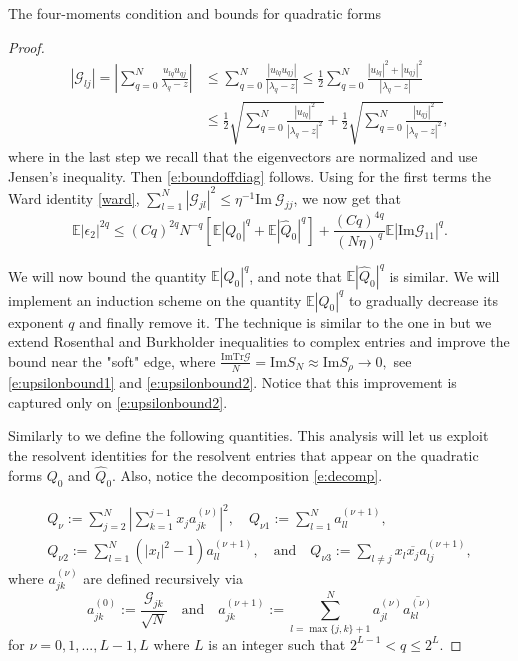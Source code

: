 \documentclass[11pt, a4paper, oneside]{book}
\numberwithin{equation}{chapter}
\newcommand{\E}{\mathbb E}
\newcommand{\Tr}{\mathrm{Tr}}
\begin{document}
\begin{section}{The four-moments condition and bounds for quadratic forms}
\begin{proof}
%
\begin{align*}
|\mathcal{G}_{lj} |= \left|\sum_{q=0}^N \frac{u_{lq}u_{qj}}{\lambda_q - z}\right| &\leq \sum_{q=0}^N \frac{|u_{lq}u_{qj}|}{|\lambda_q - z|}
\leq \frac{1}{2}\sum_{q=0}^N \frac{|u_{lq}|^2 + |u_{qj}|^2}{|\lambda_q - z|} \\ 
&\leq \frac{1}{2}\sqrt{\sum_{q=0}^N \frac{|u_{lq}|^2} {|\lambda_q - z|^2}} + \frac{1}{2}\sqrt{\sum_{q=0}^N \frac{|u_{qj}|^2} {|\lambda_q - z|^2}},
\end{align*}
%
where in the last step we recall that the eigenvectors are normalized and use Jensen's inequality. Then \eqref{e:boundoffdiag} follows. Using for the first terms the Ward identity \eqref{ward}, $\sum \limits_{l=1}^{N} | \mathcal{G}_{jl}  |^2 \leq \eta^{-1} \mathrm{Im} \ \mathcal{G}_{jj}$, we now get that
%
\begin{equation}\label{e:epsilon2bound}
\E | \epsilon_{2} |^{2q} \leq (Cq)^{2q} N^{-q}  \left [ \E |Q_0 |^q  + \E |\widehat{Q}_0 |^q \right ]+ \frac{(Cq)^{4q}}{ (N\eta)^{q}}  \E | \mathrm{Im}\mathcal{G}_{11} |^{q}.
\end{equation}

We will now bound the quantity $\E|Q_0 |^q$, and note that $\E|\widehat{Q}_0 |^q$ is similar. We will implement an induction scheme on the quantity $\E|Q_0 |^q$ to gradually decrease its exponent $q$ and finally remove it.
The technique is similar to the one in \cite{gotze2016optimal, gotze2014rate} but we extend Rosenthal and Burkholder inequalities to complex entries and improve the bound near the "soft" edge, where $\frac{\mathrm{Im} \Tr \mathcal{G}}{N} = \mathrm{Im} S_N \approx \mathrm{Im} S_{\rho} \to 0,$ see \eqref{e:upsilonbound1} and \eqref{e:upsilonbound2}. Notice that this improvement is captured only on \eqref{e:upsilonbound2}.

Similarly to \cite{gotze2016optimal} we define the following quantities. This analysis will let us exploit the resolvent identities for the resolvent entries that appear on the quadratic forms $Q_0$ and $\widehat{Q}_0$. Also, notice the decomposition \eqref{e:decomp}.

\pagebreak

\begin{multline}\label{d:Qs} Q_\nu  := \sum \limits_{j=2}^N \left | \sum_{ k=1}^{j-1} x_{j} a_{jk}^{(\nu)} \right |^2,
\quad
 Q_{\nu1}  := \sum \limits_{l=1}^N a_{ll}^{(\nu+1)} ,
 \\
%
 Q_{\nu2}  := \sum \limits_{l=1}^N \left ( |x_{l}|^2 -1 \right ) a_{ll}^{(\nu+1)}, \quad \text{and} \quad
 Q_{\nu3}  := \sum \limits_{l \neq j} x_{l}\overline{x_{j}} a_{lj}^{(\nu+1)}, 
\end{multline}
%
where $a_{jk}^{(\nu)}$ are defined recursively via
%
\begin{equation}\label{d:as}
a_{jk}^{(0)}:=  \frac{\mathcal{G}_{jk}}{\sqrt{N}}  \quad
\text{and}
\quad a_{jk}^{(\nu+1)} := \sum \limits_{l = \max\{j,k\}+1}^{N}  a_{jl}^{(\nu)}\overline{a_{kl}^{(\nu)}}\end{equation}
%
for $\nu = 0,1,...,L-1, L$ where $L$ is an integer such that $2^{L-1} < q \leq 2^{L}$. 


\end{proof}
\end{section}
\end{document}
